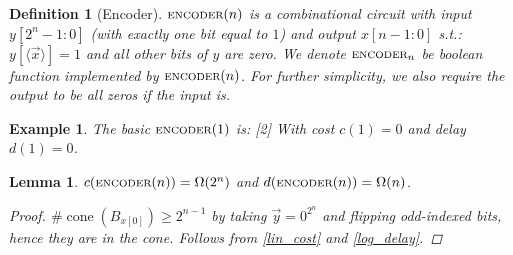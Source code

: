 \documentclass[12pt]{article}
\newcommand{\scr}[1]{{\scriptstyle\textup{#1}}}
\newcommand{\repr}[1]{\langle{#1}\rangle}
\DeclareMathOperator{\cone}{cone}
\newtheorem{definition}[theorem]{Definition}
\newtheorem{lemma}[theorem]{Lemma}
\newtheorem{example}[theorem]{Example}
\begin{document}
\begin{definition}[Encoder]
  $\scr{ENCODER}(n)$ is a combinational circuit with input $y[2^n-1:0]$ (with exactly one bit equal to $1$) and output $x[n-1:0]$ s.t.: $y[\repr{\vec{x}}]=1$ and all other bits of $y$ are zero. We denote $\scr{ENCODER}_n$ be boolean function implemented by $\scr{ENCODER}(n)$. For further simplicity, we also require the output to be all zeros if the input is.
\end{definition}

\begin{example}
  The basic $\scr{ENCODER}(1)$ is:
  [2]
  \noindent With cost $c(1)=0$ and delay $d(1)=0$.
\end{example}

\begin{lemma}
  \label{encoder_cost}
  $c(\scr{ENCODER}(n))=\Omega(2^n)$ and $d(\scr{ENCODER}(n))=\Omega(n)$.
  \begin{proof}
    $\#\cone(B_{x[0]})\geq 2^{n-1}$ by taking $\vec{y}=0^{2^n}$ and flipping odd-indexed bits, hence they are in the cone. Follows from \ref{lin_cost} and \ref{log_delay}.
  \end{proof}
\end{lemma}
\end{document}
